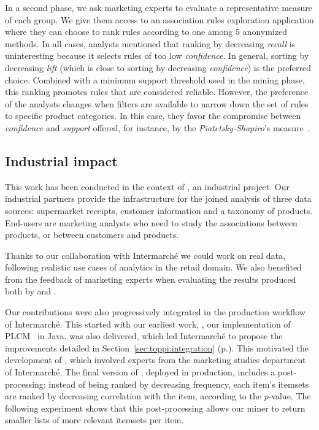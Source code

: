 In a second phase,
we ask marketing experts to evaluate a representative measure of each group.
We give them access to an association rules exploration application where they can choose
to rank rules according to one among 5 anonymized methods.
In all cases, analysts mentioned that ranking by decreasing {\em recall}
is uninteresting because it selects rules of too low {\em confidence}.
In general, sorting by decreasing {\em lift}
(which is close to sorting by decreasing {\em confidence})
is the preferred choice.
Combined with a minimum support threshold used in the mining phase,
this ranking promotes rules that are considered reliable.
However, the preference of the analysts changes when filters are available to narrow down the set of rules to specific product categories.
In this case, they favor the compromise between {\em confidence} and {\em support} offered, for instance,
by the {\em Piatetsky-Shapiro}'s measure~\cite{PiatetskyKDD91}.


\subsection{Industrial impact}

This work has been conducted in the context of \datalyse, an industrial project.
Our industrial partners provide the infrastructure for the joined analysis of three data sources:
supermarket receipts, customer information and a taxonomy of products.
End-users are marketing analysts who need to
study the associations between products,
or between customers and products.

Thanks to our collaboration with Intermarch\'e we could work on real data,
following realistic use cases of analytics in the retail domain.
We also benefited from the feedback of marketing experts
when evaluating the results produced both by \toppi and \capa.

Our contributions were also progressively integrated in the production workflow of Intermarch\'e.
This started with our earliest work, \jlcm,
our implementation of PLCM~\cite{NegrevergneHPCS10} in Java.
\toppi was also delivered,
which led Intermarch\'e to propose the improvements detailed in
Section~\ref{sec:toppi:integration} (p.\pageref{sec:toppi:integration}).
This motivated the development of \capa,
which involved experts from the marketing studies department of Intermarch\'e.
The final version of \toppi, deployed in production,
includes a post-processing:
instead of being ranked by decreasing frequency,
each item's itemsets are ranked by decreasing correlation with the item,
according to the $p$-value.
The following experiment shows that this post-processing allows our miner
to return smaller lists of more relevant itemsets per item.


